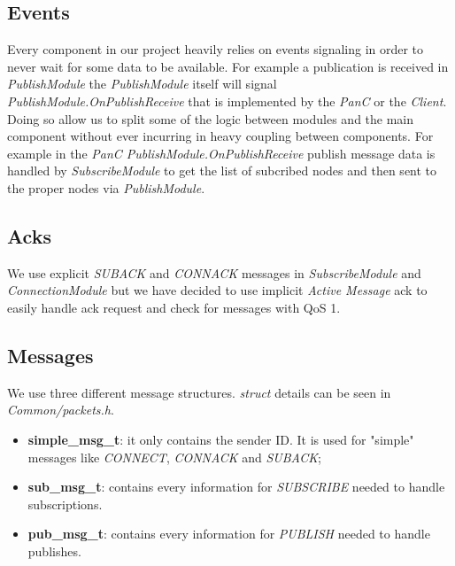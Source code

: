 \documentclass[10pt]{article}
\begin{document}
\subsection{Events}
Every component in our project heavily relies on events signaling in order to never wait for some data to be available. For example a publication is received in \emph{PublishModule} the \emph{PublishModule} itself will signal \emph{PublishModule.OnPublishReceive} that is implemented by the \emph{PanC} or the \emph{Client}. Doing so allow us to split some of the logic between modules and the main component without ever incurring in heavy coupling between components. For example in the \emph{PanC PublishModule.OnPublishReceive} publish message data is handled by \emph{SubscribeModule} to get the list of subcribed nodes and then sent to the proper nodes via \emph{PublishModule}.

\subsection{Acks}

We use explicit \emph{SUBACK} and \emph{CONNACK} messages in \emph{SubscribeModule} and \emph{ConnectionModule} but we have decided to use implicit \emph{Active Message} ack to easily handle ack request and check for messages with QoS 1.

\subsection{Messages}

We use three different message structures. \emph{struct} details can be seen in \emph{Common/packets.h}.
\begin{itemize}
\item \textbf{simple\_msg\_t}: it only contains the sender ID. It is used for "simple" messages like \emph{CONNECT}, \emph{CONNACK} and \emph{SUBACK};
\item	\textbf{sub\_msg\_t}: contains every information for \emph{SUBSCRIBE} needed to handle subscriptions.
\item \textbf{pub\_msg\_t}: contains every information for \emph{PUBLISH} needed to handle publishes.
\end{itemize}
\end{document}
